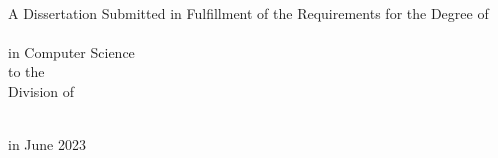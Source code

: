 \begin{titlepage}
    \begin{addmargin}[-1cm]{-3cm}
    \begin{center}
        \large

        \hfill

        \vfill

        \begingroup
            \color{CTtitle}\spacedallcaps{\myTitle} \\ \bigskip
        \endgroup

        \spacedlowsmallcaps{\myName}


        \bigskip
        A Dissertation Submitted in Fulfillment of the Requirements for the Degree of \\
        \myDegree \\
        in Computer Science \\
        \medskip
        to the \myFaculty \\
        Division of \myDepartment \\
        \myUni \\ \bigskip

        in June 2023%

        \vfill

    \end{center}
  \end{addmargin}
\end{titlepage}
